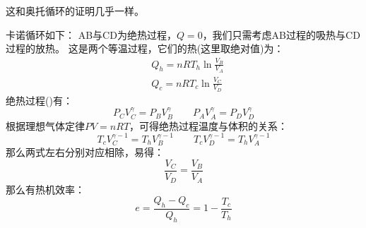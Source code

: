 \begin{prove}
    这和奥托循环的证明几乎一样。

    卡诺循环如下：
    AB与CD为绝热过程，$Q = 0$，我们只需考虑AB过程的吸热与CD过程的放热。
    这是两个等温过程，它们的热(这里取绝对值)为：
    \begin{equation}
        \begin{aligned}
             & Q_{h} = nRT_{h}\ln\frac{V_B}{V_A} \\[1ex]
             & Q_{c} = nRT_{c}\ln\frac{V_C}{V_D}
        \end{aligned}
        \nonumber
    \end{equation}
    绝热过程()有：
    \begin{equation}
        P_{C}V_{C}^{\gamma} = P_{B}V_{B}^{\gamma} \qquad   P_{A}V_{A}^{\gamma} = P_{D}V_{D}^{\gamma}
        \nonumber
    \end{equation}
    根据理想气体定律$PV=nRT$，可得绝热过程温度与体积的关系：
    \begin{equation}
        T_{c}V_{C}^{\gamma-1} = T_{h}V_{B}^{\gamma-1} \qquad T_{c}V_{D}^{\gamma-1} = T_{h}V_{A}^{\gamma-1}
        \nonumber
    \end{equation}
    那么两式左右分别对应相除，易得：
    \begin{equation}
        \frac{V_C}{V_D} = \frac{V_B}{V_A}
        \nonumber
    \end{equation}
    那么有热机效率：
    \begin{equation}
        e = \frac{Q_{h}-Q_{c}}{Q_{h}} = 1 - \frac{T_{c}}{T_{h}}
    \end{equation}
\end{prove}
